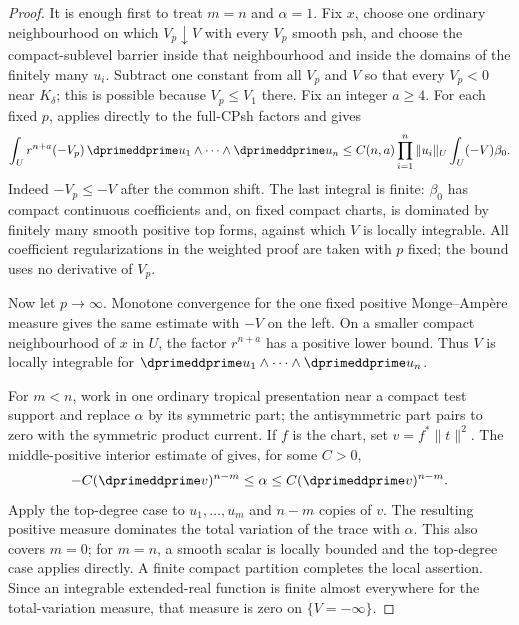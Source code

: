\begin{proof}
It is enough first to treat $m=n$ and $\alpha=1$.  Fix $x$, choose one
ordinary neighbourhood on which $V_p\downarrow V$ with every $V_p$ smooth
psh, and choose the compact-sublevel barrier inside that neighbourhood and
inside the domains of the finitely many $u_i$.  Subtract one constant from
all $V_p$ and $V$ so that every $V_p<0$ near $K_\delta$; this is possible
because $V_p\leq V_1$ there.  Fix an integer $a\geq4$.  For each fixed $p$,
 applies directly to the full-CPsh factors and
gives
\begin{equation}
\label{eq:cld-weighted-cln}
 \int_U r^{n+a}(-V_p)\,
       \dprimeddprime u_1\wedge\cdots\wedge\dprimeddprime u_n
 \leq C(n,a)\prod_{i=1}^n\|u_i\|_U\int_U(-V)\beta_0.
\end{equation}
Indeed $-V_p\leq -V$ after the common shift.  The last integral is finite:
$\beta_0$ has compact continuous coefficients and, on fixed compact charts,
is dominated by finitely many smooth positive top forms, against which $V$
is locally integrable.  All coefficient regularizations in the weighted
proof are taken with $p$ fixed; the bound uses no derivative of $V_p$.

Now let $p\to\infty$.  Monotone convergence for the one fixed positive
Monge--Amp\`ere measure gives the same estimate with $-V$ on the left.
On a smaller compact neighbourhood of $x$ in $U$, the factor $r^{n+a}$ has a
positive lower bound.  Thus $V$ is locally integrable for
$\dprimeddprime u_1\wedge\cdots\wedge\dprimeddprime u_n$.

For $m<n$, work in one ordinary tropical presentation near a compact test
support and replace $\alpha$ by its symmetric part; the antisymmetric part
pairs to zero with the symmetric product current.  If $f$ is the chart, set
$v=f^*\|t\|^2$.  The middle-positive interior estimate of
 gives, for some $C>0$,
\[
 -C(\dprimeddprime v)^{n-m}\leq\alpha
        \leq C(\dprimeddprime v)^{n-m}.
\]
Apply the top-degree case to $u_1,\ldots,u_m$ and $n-m$ copies of $v$.
The resulting positive measure dominates the total variation of the trace
with $\alpha$.  This also covers $m=0$; for $m=n$, a smooth scalar is locally
bounded and the top-degree case applies directly.  A finite compact
partition completes the local assertion.  Since an integrable extended-real
function is finite almost everywhere for the total-variation measure, that
measure is zero on $\{V=-\infty\}$.
\end{proof}

